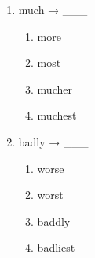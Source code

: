 \documentclass[11pt,a4paper]{ctexart}
\begin{document}
\begin{enumerate}[leftmargin=*,itemsep=4pt]
\begin{enumerate}[label=\Alph*.,leftmargin=2em,itemsep=1pt,topsep=2pt]
\item better
\item best
\item gooder
\item weller
\end{enumerate}
\item much → \_\_\_
\begin{enumerate}[label=\Alph*.,leftmargin=2em,itemsep=1pt,topsep=2pt]
\item more
\item most
\item mucher
\item muchest
\end{enumerate}
\item badly → \_\_\_
\begin{enumerate}[label=\Alph*.,leftmargin=2em,itemsep=1pt,topsep=2pt]
\item worse
\item worst
\item baddly
\item badliest
\end{enumerate}
\end{enumerate}
\end{document}
